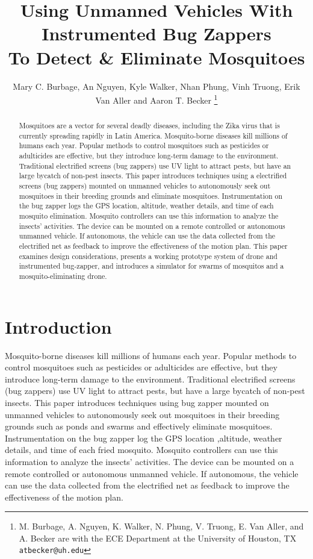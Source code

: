 \documentclass[letterpaper, 10 pt, conference]{ieeeconf}  %
\title{\LARGE \bf
Using Unmanned Vehicles With Instrumented Bug Zappers\\ To Detect \& Eliminate Mosquitoes
}
\author{Mary C. Burbage, An Nguyen, Kyle Walker, Nhan Phung, Vinh Truong, Erik Van Aller and Aaron T. Becker%
\thanks{M. Burbage, A. Nguyen, K. Walker, N. Phung, V. Truong, E. Van Aller, and A. Becker are with the ECE Department at the University of Houston, TX
        {\tt\small atbecker@uh.edu}}%
}
\begin{document}
\maketitle
\thispagestyle{empty}
\pagestyle{empty}


\begin{abstract}
Mosquitoes are a vector for several deadly diseases, including the Zika virus that is currently spreading rapidly in Latin America.
Mosquito-borne diseases kill millions of humans each year. Popular methods to control mosquitoes such as pesticides or adulticides are effective, but they introduce long-term damage to the environment. Traditional electrified screens (bug zappers) use UV light to attract pests, but have an large bycatch of non-pest insects. This paper introduces techniques using a electrified screens (bug zappers) mounted on unmanned vehicles to autonomously seek out mosquitoes in their breeding grounds and eliminate mosquitoes. Instrumentation on the bug zapper logs the GPS location, altitude, weather details, and time of each mosquito elimination. Mosquito controllers can use this information to analyze the insects' activities. The device can be mounted on a remote controlled or autonomous unmanned vehicle. If autonomous, the vehicle can use the data collected from the electrified net as feedback to improve the effectiveness of the motion plan. 
This paper examines design considerations, presents a working prototype system of drone and instrumented bug-zapper, and introduces a simulator for swarms of mosquitos and a mosquito-eliminating drone.  
\end{abstract}


\section{Introduction}

Mosquito-borne diseases kill millions of humans each year. Popular methods to control mosquitoes such as pesticides or adulticides are effective, but they introduce long-term damage to the environment. Traditional electrified screens (bug zappers) use UV light to attract pests, but have a large bycatch of non-pest insects. This paper introduces techniques using bug zapper mounted on unmanned vehicles to autonomously seek out mosquitoes in their breeding grounds such as ponds and swarms and effectively eliminate mosquitoes. Instrumentation on the bug zapper log the GPS location ,altitude,  weather details, and time of each fried mosquito. Mosquito controllers can use this information to analyze the insects' activities. The device can be mounted on a remote controlled or autonomous unmanned vehicle. If autonomous, the vehicle can use the data collected from the electrified net as feedback to improve the effectiveness of the motion plan. 
\end{document}
